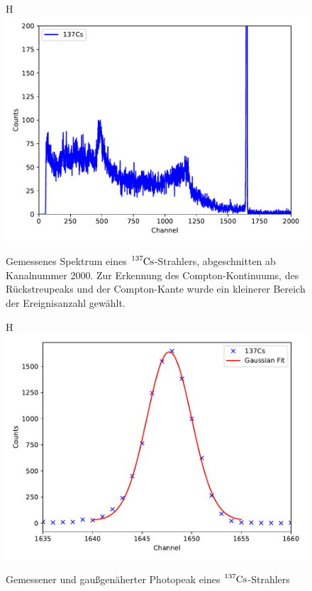 \begin{figure}{H}
  \centering
  \includegraphics[scale=0.7]{content/plot21.pdf}
  \caption{Gemessenes Spektrum eines $\ce{^{137}Cs}$-Strahlers, abgeschnitten ab Kanalnummer $\num{2000}$. Zur Erkennung
    des Compton-Kontinuums, des Rückstreupeaks und der Compton-Kante wurde ein kleinerer Bereich der Ereignisanzahl gewählt.}
  \label{fig:plot21}
\end{figure}

\begin{figure}{H}
  \centering
  \includegraphics[scale=0.7]{content/plot22.pdf}
  \caption{Gemessener und gaußgenäherter Photopeak eines $\ce{^{137}Cs}$-Strahlers}
  \label{fig:plot22}
\end{figure}

